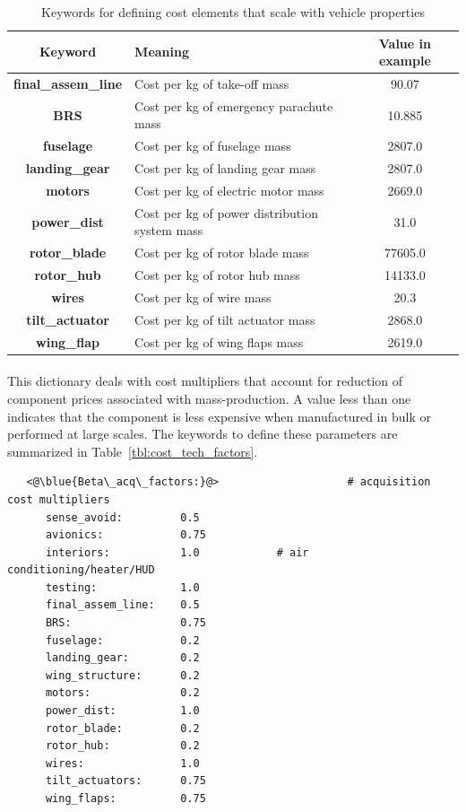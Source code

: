 \begin{table}[h]
\begin{center}
	\caption{Keywords for defining cost elements that scale with vehicle properties}
	\label{tbl:scaling_cost_keywords}
    \begin{tabular}{| c | l | c |}
    \hline
    Keyword & Meaning & Value in example \\ 
    \hline
\textbf{final\_assem\_line} & Cost per kg of take-off mass &  90.07 \\
\textbf{BRS} & Cost per kg of emergency parachute mass &  10.885 \\
\textbf{fuselage} & Cost per kg of fuselage mass & 2807.0  \\
\textbf{landing\_gear} & Cost per kg of landing gear mass & 2807.0  \\
\textbf{motors} & Cost per kg of electric motor mass &   2669.0\\
\textbf{power\_dist} & Cost per kg of power distribution system mass & 31.0 \\
\textbf{rotor\_blade} & Cost per kg of rotor blade mass &  77605.0 \\
\textbf{rotor\_hub} & Cost per kg of rotor hub mass &  14133.0 \\
\textbf{wires} & Cost per kg of wire mass &  20.3\\
\textbf{tilt\_actuator} & Cost per kg of tilt actuator mass &  2868.0 \\
\textbf{wing\_flap} & Cost per kg of wing flaps mass &  2619.0 \\
     \hline
  \end{tabular}
\end{center}
\end{table}

\paragraph{}
This dictionary deals with cost multipliers that account for reduction of component prices associated with mass-production. A value less than one indicates that the component is less expensive when manufactured in bulk or performed at large scales. The keywords to define these parameters are summarized in Table~\ref{tbl:cost_tech_factors}. 

\begin{lstlisting}
   <@\blue{Beta\_acq\_factors:}@>                    # acquisition cost multipliers 
      sense_avoid:         0.5            
      avionics:            0.75           
      interiors:           1.0            # air conditioning/heater/HUD
      testing:             1.0            
      final_assem_line:    0.5            
      BRS:                 0.75           
      fuselage:            0.2            
      landing_gear:        0.2            
      wing_structure:      0.2            
      motors:              0.2            
      power_dist:          1.0            
      rotor_blade:         0.2            
      rotor_hub:           0.2            
      wires:               1.0            
      tilt_actuators:      0.75           
      wing_flaps:          0.75           
\end{lstlisting}

